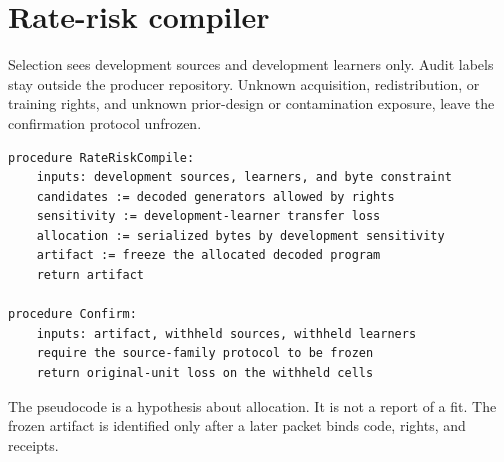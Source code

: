 \section{Rate-risk compiler}
Selection sees development sources and development learners only.
Audit labels stay outside the producer repository.
Unknown acquisition, redistribution, or training rights, and unknown prior-design or contamination exposure, leave the confirmation protocol unfrozen.

\begin{verbatim}
procedure RateRiskCompile:
    inputs: development sources, learners, and byte constraint
    candidates := decoded generators allowed by rights
    sensitivity := development-learner transfer loss
    allocation := serialized bytes by development sensitivity
    artifact := freeze the allocated decoded program
    return artifact

procedure Confirm:
    inputs: artifact, withheld sources, withheld learners
    require the source-family protocol to be frozen
    return original-unit loss on the withheld cells
\end{verbatim}

\noindent The pseudocode is a hypothesis about allocation.
It is not a report of a fit.
The frozen artifact is identified only after a later packet binds code, rights, and receipts.
